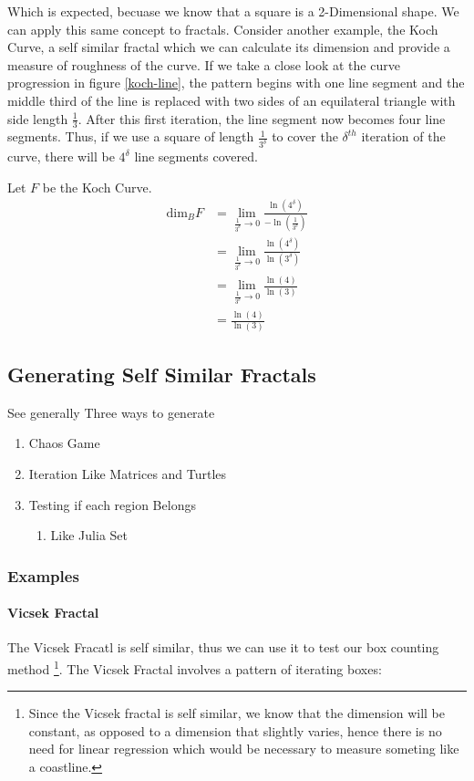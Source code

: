 \documentclass[11pt]{article}
\begin{document}
Which is expected, becuase we know that a square is a 2-Dimensional shape. We
can apply this same concept to fractals. Consider another example, the Koch
Curve, a self similar fractal which we can calculate its dimension and provide a
measure of roughness of the curve. If we take a close look at the curve progression
in figure \ref{koch-line}, the pattern begins with one line segment and the middle third
of the line is replaced with two sides of an equilateral triangle with side length
\(\frac{1}{3}\). After this first iteration, the line segment now becomes four line
segments. Thus, if we use a square of length \(\frac{1}{3^{\delta}}\) to cover the \(\delta^{th}\)
iteration of the curve, there will be \(4^{\delta}\) line segments covered.

Let \(F\) be the Koch Curve.
\begin{align*}
\text{dim}_BF &= \lim_{\frac{1}{3^{\delta}} \to 0} \frac{\ln(4^{\delta})}{-\ln(\frac{1}{3^{\delta}})}\\
&= \lim_{\frac{1}{3^{\delta}} \to 0} \frac{\ln(4^{\delta})}{\ln(3^{\delta})}\\
&= \lim_{\frac{1}{3^{\delta}} \to 0} \frac{\ln(4)}{\ln(3)}\\
&= \frac{\ln(4)}{\ln(3)}
\end{align*}
\subsection{Generating Self Similar Fractals}
\label{sec:orge151ba3}
See generally \cite[Ch. 11]{strogatzNonlinearDynamicsChaos2015}
Three ways to generate

\begin{enumerate}
\item Chaos Game
\item Iteration Like Matrices and Turtles
\item Testing if each region Belongs
\begin{enumerate}
\item Like Julia Set
\end{enumerate}
\end{enumerate}

\subsubsection{Examples}
\label{sec:org9c20e35}
\paragraph{Vicsek Fractal}
\label{sec:orgb6d2717}
The Vicsek Fracatl is self similar, thus we can use it to test our box counting method \footnote{Since the Vicsek fractal is self similar, we know that the dimension will be constant, as opposed to a dimension that slightly varies, hence there is no need for linear regression which would be necessary to measure someting like a coastline.}.
The Vicsek Fractal involves a pattern of iterating boxes:
\end{document}
